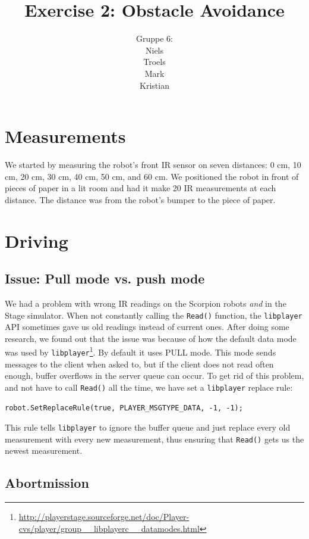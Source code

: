\documentclass[a4paper,12pt]{article}
\title{Exercise 2: Obstacle Avoidance}
\author{Gruppe 6:  \\ Niels \\ Troels \\ Mark \\ Kristian}
\begin{document}
\maketitle

\section{Measurements}

We started by measuring the robot's front IR sensor on seven distances: 0 cm, 10
cm, 20 cm, 30 cm, 40 cm, 50 cm, and 60 cm.  We positioned the robot in front of
pieces of paper in a lit room and had it make 20 IR measurements at each
distance.  The distance was from the robot's bumper to the piece of paper.


\section{Driving}

\subsection{Issue: Pull mode vs. push mode}

We had a problem with wrong IR readings on the Scorpion robots \emph{and} in the
Stage simulator.  When not constantly calling the \texttt{Read()} function, the
\texttt{libplayer} API sometimes gave us old readings instead of current ones.
After doing some research, we found out that the issue was because of how the
default data mode was used by
\texttt{libplayer}\footnote{\url{http://playerstage.sourceforge.net/doc/Player-cvs/player/group__libplayerc__datamodes.html}}.
By default it uses PULL mode.  This mode sends messages to the client when asked
to, but if the client does not read often enough, buffer overflows in the server
queue can occur.  To get rid of this problem, and not have to call
\texttt{Read()} all the time, we have set a \texttt{libplayer} replace rule:

\begin{verbatim}
robot.SetReplaceRule(true, PLAYER_MSGTYPE_DATA, -1, -1);
\end{verbatim}

This rule tells \texttt{libplayer} to ignore the buffer queue and just replace
every old measurement with every new measurement, thus ensuring that
\texttt{Read()} gets us the newest measurement.

\subsection{Abortmission}
\end{document}
